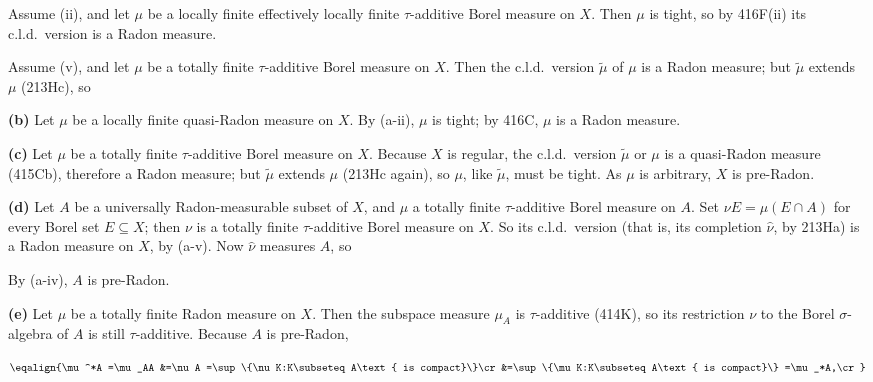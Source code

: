 {\medskip

 Assume (ii), and let $\mu$ be a locally
finite effectively locally finite $\tau$-additive Borel measure on $X$.
Then $\mu$ is tight, so by
416F(ii) its c.l.d.\ version is a Radon measure.

\medskip

 Assume (v), and let $\mu$ be a totally
finite $\tau$-additive Borel measure on $X$.   Then the c.l.d.\ version
$\tilde\mu$ of $\mu$ is a Radon measure;  but $\tilde\mu$ extends $\mu$
(213Hc), so


\medskip

{\bf (b)} Let $\mu$ be a locally finite quasi-Radon measure on $X$.   By
(a-ii), $\mu$ is tight;  by 416C, $\mu$ is a Radon measure.

\medskip

{\bf (c)} Let $\mu$ be a totally finite $\tau$-additive Borel measure on
$X$.   Because $X$ is regular, the c.l.d.\ version $\tilde\mu$ or $\mu$ is a
quasi-Radon measure (415Cb), therefore a Radon measure;  but $\tilde\mu$
extends $\mu$
(213Hc again), so $\mu$, like $\tilde\mu$, must be tight.   As $\mu$ is
arbitrary, $X$ is pre-Radon.

\medskip

{\bf (d)} Let $A$ be a universally Radon-measurable subset of $X$, and $\mu$
a totally finite $\tau$-additive Borel measure on
$A$.   Set
$\nu E=\mu(E\cap A)$ for every Borel set $E\subseteq X$;  then $\nu$ is
a totally finite $\tau$-additive Borel measure on $X$.   So its c.l.d.\
version (that is, its completion $\hat\nu$, by 213Ha) is a Radon measure
on $X$, by (a-v).   Now $\hat\nu$ measures $A$, so


\noindent By (a-iv), $A$ is pre-Radon.

\medskip

{\bf (e)} Let $\mu$ be a totally finite Radon measure on $X$.   Then the
subspace measure $\mu_A$ is $\tau$-additive (414K), so its restriction
$\nu$ to the Borel $\sigma$-algebra of $A$ is still $\tau$-additive.
Because $A$ is pre-Radon,

$$\eqalign{\mu^*A
=\mu_AA
&=\nu A
=\sup\{\nu K:K\subseteq A\text{ is compact}\}\cr
&=\sup\{\mu K:K\subseteq A\text{ is compact}\}
=\mu_*A,\cr}$$

}
